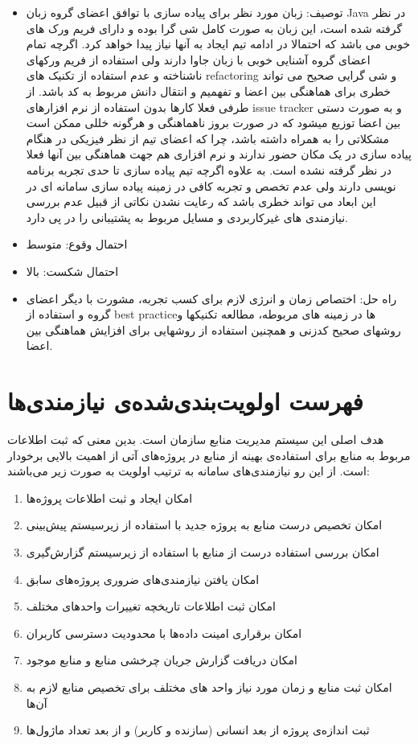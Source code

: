 \documentclass{article}
\begin{document}
\begin{itemize}
\item توصیف: زبان مورد نظر برای پیاده سازی با توافق اعضای گروه زبان Java در نظر گرفته شده است، این زبان به صورت کامل شی گرا بوده و دارای فریم ورک های خوبی می باشد که احتمالا در ادامه تیم ایجاد به آنها نیاز پیدا خواهد کرد. اگرچه تمام اعضای گروه آشنایی خوبی با زبان جاوا دارند ولی استفاده از فریم ورکهای ناشناخته و عدم استفاده از تکنیک های refactoring  و شی گرایی صحیح می تواند خطری برای هماهنگی بین اعضا و تفهمیم و انتقال دانش مربوط به کد باشد. از طرفی فعلا کارها بدون استفاده از نرم افزارهای issue tracker و به صورت دستی بین اعضا توزیع میشود که در صورت بروز ناهماهنگی و هرگونه خللی ممکن است مشکلاتی را به همراه داشته باشد، چرا که اعضای تیم از نظر فیزیکی در هنگام پیاده سازی در یک مکان حضور ندارند و نرم افزاری هم جهت هماهنگی بین آنها فعلا در نظر گرفته نشده است.
به علاوه اگرچه تیم پیاده سازی تا حدی تجربه برنامه نویسی دارند ولی عدم تخصص و تجربه کافی در زمینه پیاده سازی سامانه ای در این ابعاد می تواند خطری باشد که رعایت نشدن نکاتی از قبیل عدم بررسی نیازمندی های غیرکاربردی و مسایل مربوط به پشتیبانی را در پی دارد.
\item احتمال وقوع: متوسط
\item احتمال شکست: بالا
\item راه حل: اختصاص زمان و انرژی لازم برای کسب تجربه، مشورت با دیگر اعضای گروه و استفاده از best practiceها در زمینه های مربوطه، مطالعه تکنیکها و روشهای صحیح کدزنی و همچنین استفاده از روشهایی برای افزایش هماهنگی بین اعضا.
\end{itemize}


\newpage
\section{فهرست اولویت‌بندی‌شده‌ی نیازمندی‌ها}

هدف اصلی این سیستم مدیریت منابع سازمان است. بدین معنی که ثبت اطلاعات مربوط به منابع برای استفاده‌ی بهینه از منابع در پروژه‌های آتی از اهمیت بالایی برخودار است. از این رو نیازمندی‌های سامانه به ترتیب اولویت به صورت زیر می‌باشند:

\begin{enumerate}
\item
امکان ایجاد و ثبت اطلاعات پروژه‌ها
\item
امکان تخصیص درست منابع به پروژه جدید با استفاده از زیرسیستم پیش‌بینی 
\item
امکان بررسی استفاده درست از منابع با استفاده از زیرسیستم گزارش‌گیری
\item
امکان یافتن نیازمندی‌های ضروری پروژه‌های سابق
\item
امکان ثبت اطلاعات تاریخچه تغییرات واحدهای مختلف
\item
امکان برقراری امینت داده‌ها با محدودیت دسترسی کاربران
\item
امکان دریافت گزارش جریان چرخشی منابع و منابع موجود
\item
امکان ثبت منابع و زمان مورد نیاز واحد های مختلف برای تخصیص منابع لازم به آن‌ها
\item
ثبت اندازه‌ی پروژه از بعد انسانی (سازنده و کاربر) و از بعد تعداد ماژول‌ها

\end{enumerate}
\end{document}
